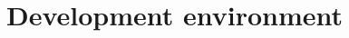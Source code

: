 \section{Development environment}
\begin{comment}
The object of this chapter is to give a brief introduction to which technologies and tools the team used as an aid in the development process.

The team decided, in conjunction with the customer, which technologies to use for the collaboration of code, including which code conventions and design guidelines to follow. 

This chapter describes the tools and libraries that were used as aid in the development of the code, what code convention we practiced, which tools we used for our collaboration on the documentation and our main channels of communication.
\end{comment}


\newpage






